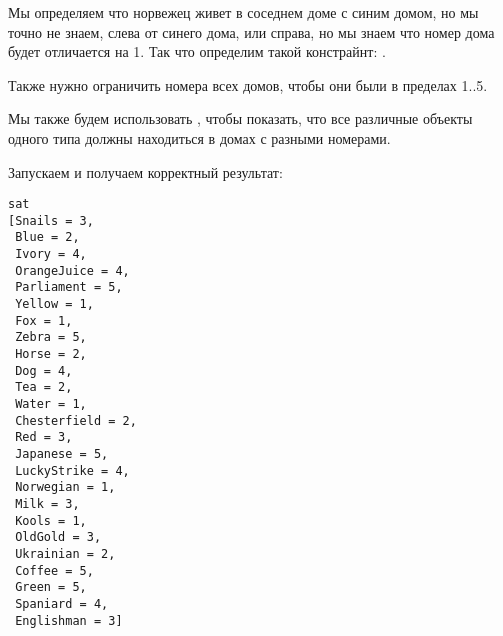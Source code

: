 Мы определяем что норвежец живет в соседнем доме с синим домом, но мы точно не знаем, слева от синего дома, или справа,
но мы знаем что номер дома будет отличается на 1.
Так что определим такой констрайнт: .

Также нужно ограничить номера всех домов, чтобы они были в пределах 1..5.

Мы также будем использовать , чтобы показать, что все различные объекты одного типа должны находиться в домах
с разными номерами.



Запускаем и получаем корректный результат:

\begin{lstlisting}
sat
[Snails = 3,
 Blue = 2,
 Ivory = 4,
 OrangeJuice = 4,
 Parliament = 5,
 Yellow = 1,
 Fox = 1,
 Zebra = 5,
 Horse = 2,
 Dog = 4,
 Tea = 2,
 Water = 1,
 Chesterfield = 2,
 Red = 3,
 Japanese = 5,
 LuckyStrike = 4,
 Norwegian = 1,
 Milk = 3,
 Kools = 1,
 OldGold = 3,
 Ukrainian = 2,
 Coffee = 5,
 Green = 5,
 Spaniard = 4,
 Englishman = 3]
\end{lstlisting}

